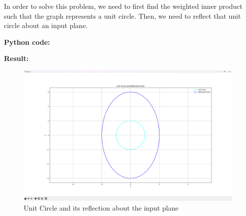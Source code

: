 In order to solve this problem, we need to first find the weighted inner product such that the graph represents a unit circle. Then, we need to reflect that unit circle about an input plane.\\[6pt]

\vspace*{1cm}

\textbf{Python code:}


\clearpage

\textbf{Result:}
\begin{figure}[H]
    \centering
    \includegraphics[width=16cm]{graphics/3.png}
    \caption*{Unit Circle and its reflection about the input plane}
\end{figure}